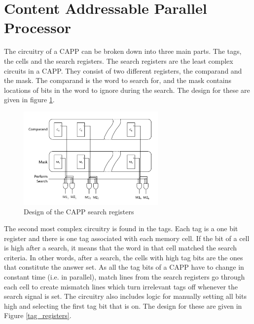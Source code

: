 \section{Content Addressable Parallel Processor}
The circuitry of a CAPP can be broken down into three main parts. The tags, the cells and the search registers. 
The search registers are the least complex circuits in a CAPP. They consist of two different registers, the comparand and the mask. The comparand is the word to search for, and the mask contains locations of bits in the word to ignore during the search. The design for these are given in figure \ref{search_circuit}.

\begin{figure}
  \includegraphics[height=5cm]{FPGA-CAPP_research_paper/images/search_registers.png}
  \caption{Design of the CAPP search registers}
  \label{search_circuit}
\end{figure}

The second most complex circuitry is found in the tags. Each tag is a one bit register and there is one tag associated with each memory cell. If the bit of a cell is high after a search, it means that the word in that cell matched the search criteria. In other words, after a search, the cells with high tag bits are the ones that constitute the answer set. As all the tag bits of a CAPP have to change in constant time (i.e. in parallel), match lines from the search registers go through each cell to create mismatch lines which turn irrelevant tags off whenever the search signal is set. The circuitry also includes logic for manually setting all bits high and selecting the first tag bit that is on. The design for these are given in Figure \ref{tag_registers}.

